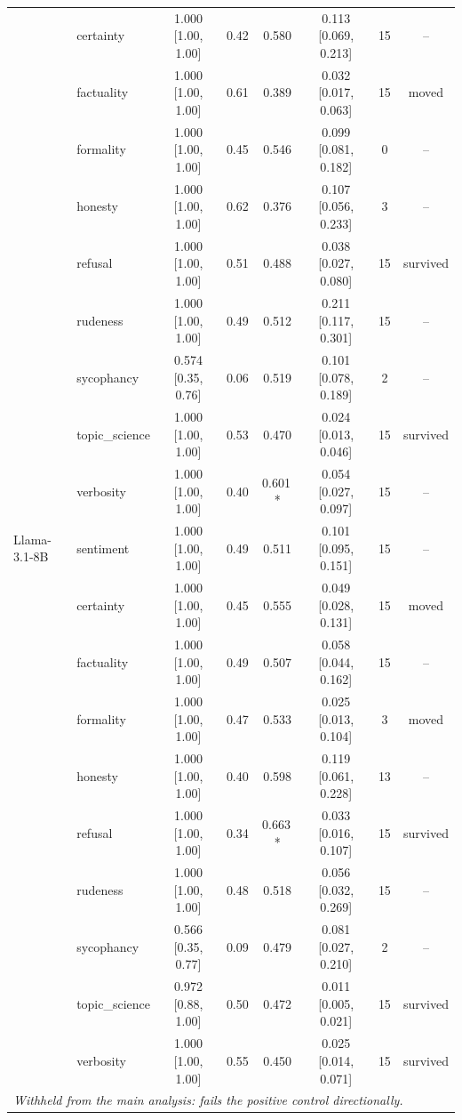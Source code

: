 \documentclass{article}
\begin{document}
\begin{table}[htbp]
\begin{tabular}{llcccccc}
     & certainty & 1.000 [1.00, 1.00] & 0.42 & 0.580 & 0.113 [0.069, 0.213] & 15 & -- \\
     & factuality & 1.000 [1.00, 1.00] & 0.61 & 0.389 & 0.032 [0.017, 0.063] & 15 & moved \\
     & formality & 1.000 [1.00, 1.00] & 0.45 & 0.546 & 0.099 [0.081, 0.182] & 0 & -- \\
     & honesty & 1.000 [1.00, 1.00] & 0.62 & 0.376 & 0.107 [0.056, 0.233] & 3 & -- \\
     & refusal & 1.000 [1.00, 1.00] & 0.51 & 0.488 & 0.038 [0.027, 0.080] & 15 & survived \\
     & rudeness & 1.000 [1.00, 1.00] & 0.49 & 0.512 & 0.211 [0.117, 0.301] & 15 & -- \\
     & sycophancy & 0.574 [0.35, 0.76] & 0.06 & 0.519 & 0.101 [0.078, 0.189] & 2 & -- \\
     & topic\_science & 1.000 [1.00, 1.00] & 0.53 & 0.470 & 0.024 [0.013, 0.046] & 15 & survived \\
     & verbosity & 1.000 [1.00, 1.00] & 0.40 & 0.601\,* & 0.054 [0.027, 0.097] & 15 & -- \\
    \midrule
    Llama-3.1-8B & sentiment & 1.000 [1.00, 1.00] & 0.49 & 0.511 & 0.101 [0.095, 0.151] & 15 & -- \\
     & certainty & 1.000 [1.00, 1.00] & 0.45 & 0.555 & 0.049 [0.028, 0.131] & 15 & moved \\
     & factuality & 1.000 [1.00, 1.00] & 0.49 & 0.507 & 0.058 [0.044, 0.162] & 15 & -- \\
     & formality & 1.000 [1.00, 1.00] & 0.47 & 0.533 & 0.025 [0.013, 0.104] & 3 & moved \\
     & honesty & 1.000 [1.00, 1.00] & 0.40 & 0.598 & 0.119 [0.061, 0.228] & 13 & -- \\
     & refusal & 1.000 [1.00, 1.00] & 0.34 & 0.663\,* & 0.033 [0.016, 0.107] & 15 & survived \\
     & rudeness & 1.000 [1.00, 1.00] & 0.48 & 0.518 & 0.056 [0.032, 0.269] & 15 & -- \\
     & sycophancy & 0.566 [0.35, 0.77] & 0.09 & 0.479 & 0.081 [0.027, 0.210] & 2 & -- \\
     & topic\_science & 0.972 [0.88, 1.00] & 0.50 & 0.472 & 0.011 [0.005, 0.021] & 15 & survived \\
     & verbosity & 1.000 [1.00, 1.00] & 0.55 & 0.450 & 0.025 [0.014, 0.071] & 15 & survived \\
    \midrule
    \multicolumn{8}{l}{\textit{Withheld from the main analysis: fails the positive control directionally.}} \\

\end{tabular}
\end{table}
\end{document}
